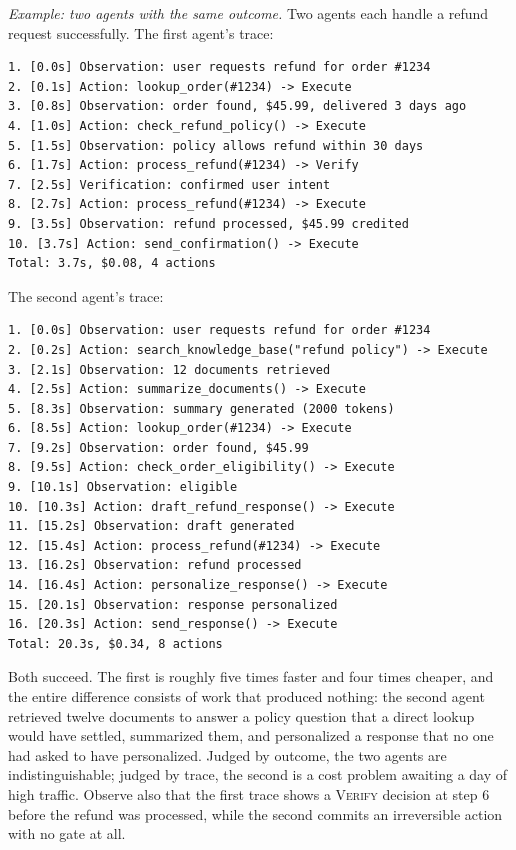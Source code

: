 \documentclass[11pt]{book}
\begin{document}
\textit{Example: two agents with the same outcome.} Two agents each handle a refund request successfully. The first agent's trace:

{\footnotesize
\begin{verbatim}
1. [0.0s] Observation: user requests refund for order #1234
2. [0.1s] Action: lookup_order(#1234) -> Execute
3. [0.8s] Observation: order found, $45.99, delivered 3 days ago
4. [1.0s] Action: check_refund_policy() -> Execute
5. [1.5s] Observation: policy allows refund within 30 days
6. [1.7s] Action: process_refund(#1234) -> Verify
7. [2.5s] Verification: confirmed user intent
8. [2.7s] Action: process_refund(#1234) -> Execute
9. [3.5s] Observation: refund processed, $45.99 credited
10. [3.7s] Action: send_confirmation() -> Execute
Total: 3.7s, $0.08, 4 actions
\end{verbatim}
}

The second agent's trace:

{\footnotesize
\begin{verbatim}
1. [0.0s] Observation: user requests refund for order #1234
2. [0.2s] Action: search_knowledge_base("refund policy") -> Execute
3. [2.1s] Observation: 12 documents retrieved
4. [2.5s] Action: summarize_documents() -> Execute
5. [8.3s] Observation: summary generated (2000 tokens)
6. [8.5s] Action: lookup_order(#1234) -> Execute
7. [9.2s] Observation: order found, $45.99
8. [9.5s] Action: check_order_eligibility() -> Execute
9. [10.1s] Observation: eligible
10. [10.3s] Action: draft_refund_response() -> Execute
11. [15.2s] Observation: draft generated
12. [15.4s] Action: process_refund(#1234) -> Execute
13. [16.2s] Observation: refund processed
14. [16.4s] Action: personalize_response() -> Execute
15. [20.1s] Observation: response personalized
16. [20.3s] Action: send_response() -> Execute
Total: 20.3s, $0.34, 8 actions
\end{verbatim}
}

Both succeed. The first is roughly five times faster and four times cheaper, and the entire difference consists of work that produced nothing: the second agent retrieved twelve documents to answer a policy question that a direct lookup would have settled, summarized them, and personalized a response that no one had asked to have personalized. Judged by outcome, the two agents are indistinguishable; judged by trace, the second is a cost problem awaiting a day of high traffic. Observe also that the first trace shows a \textsc{Verify} decision at step 6 before the refund was processed, while the second commits an irreversible action with no gate at all.
\end{document}
